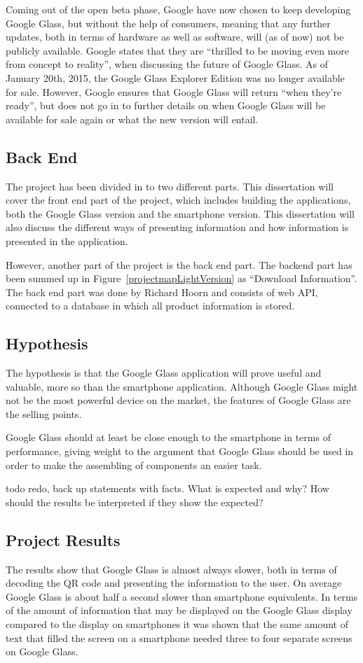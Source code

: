 Coming out of the open beta phase, Google have now chosen to keep developing Google Glass, but without the help of consumers, meaning that any further updates, both in terms of hardware as well as software, will (as of now) not be publicly available. Google states that they are ``thrilled to be moving even more from concept to reality'', when discussing the future of Google Glass. As of January 20th, 2015, the Google Glass Explorer Edition was no longer available for sale. However, Google ensures that Google Glass will return ``when they're ready'', but does not go in to further details on when Google Glass will be available for sale again or what the new version will entail. 

\subsection{Back End}
The project has been divided in to two different parts. This dissertation will cover the front end part of the project, which includes building the applications, both the Google Glass version and the smartphone version. This dissertation will also discuss the different ways of presenting information and how information is presented in the application.

However, another part of the project is the back end part. The backend part has been summed up in Figure~\ref{projectmapLightVersion} as ``Download Information''. The back end part was done by Richard Hoorn and consists of web API, connected to a database in which all product information is stored. 

\subsection{Hypothesis}
The hypothesis is that the Google Glass application will prove useful and valuable, more so than the smartphone application. Although Google Glass might not be the most powerful device on the market, the features of Google Glass are the selling points. 



Google Glass should at least be close enough to the smartphone in terms of performance, giving weight to the argument that Google Glass should be used in order to make the assembling of components an easier task.

todo redo, back up statements with facts. What is expected and why? How should the results be interpreted if they show the expected?

\subsection{Project Results}
The results show that Google Glass is almost always slower, both in terms of decoding the QR code and presenting the information to the user. On average Google Glass is about half a second slower than smartphone equivalents. In terms of the amount of information that may be displayed on the Google Glass display compared to the display on smartphones it was shown that the same amount of text that filled the screen on a smartphone needed three to four separate screens on Google Glass.

